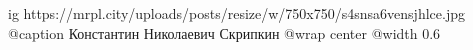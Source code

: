  
 
 
 
 

\ifcmt
  ig https://mrpl.city/uploads/posts/resize/w/750x750/s4snsa6vensjhlce.jpg
	@caption Константин Николаевич Скрипкин
  @wrap center
  @width 0.6
\fi

